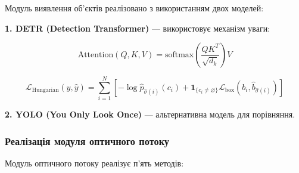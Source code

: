 \documentclass[14pt, a4paper]{extarticle}
\numberwithin{equation}{section}
\begin{document}
Модуль виявлення об'єктів реалізовано з використанням двох моделей:

\textbf{1. DETR (Detection Transformer)} — використовує механізм уваги:

\begin{equation}
\text{Attention}(Q, K, V) = \text{softmax}\left(\frac{QK^T}{\sqrt{d_k}}\right)V \tag{4.7}
\end{equation}

\begin{equation}
\mathcal{L}_{\text{Hungarian}}(y, \hat{y}) = \sum_{i=1}^N \left[ -\log \hat{p}_{\hat{\sigma}(i)}(c_i) + \mathbf{1}_{\{c_i \neq \varnothing\}} \mathcal{L}_{\text{box}}(b_i, \hat{b}_{\hat{\sigma}(i)}) \right] \tag{4.8}
\end{equation}

\textbf{2. YOLO (You Only Look Once)} — альтернативна модель для порівняння.

\subsubsection{Реалізація модуля оптичного потоку}

Модуль оптичного потоку реалізує п'ять методів:
\end{document}
